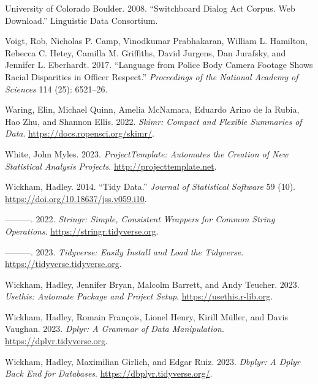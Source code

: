 \documentclass[
  letterpaper,
  DIV=11,
  numbers=noendperiod]{scrreport}
\newlength{\cslhangindent}
\newlength{\cslentryspacingunit} %
\newenvironment{CSLReferences}[2] %
 {%
  \setlength{\parindent}{0pt}
  \ifodd #1
  \let\oldpar\par
  \def\par{\hangindent=\cslhangindent\oldpar}
  \fi
  \setlength{\parskip}{#2\cslentryspacingunit}
 }%
 {}
\theoremstyle{definition}
\theoremstyle{remark}
\begin{document}
\begin{CSLReferences}{1}{0}
\leavevmode{}%
University of Colorado Boulder. 2008. {``Switchboard Dialog Act Corpus.
Web Download.''} Linguistic Data Consortium.

\leavevmode{}%
Voigt, Rob, Nicholas P. Camp, Vinodkumar Prabhakaran, William L.
Hamilton, Rebecca C. Hetey, Camilla M. Griffiths, David Jurgens, Dan
Jurafsky, and Jennifer L. Eberhardt. 2017. {``Language from Police Body
Camera Footage Shows Racial Disparities in Officer Respect.''}
\emph{Proceedings of the National Academy of Sciences} 114 (25):
6521--26.

\leavevmode{}%
Waring, Elin, Michael Quinn, Amelia McNamara, Eduardo Arino de la Rubia,
Hao Zhu, and Shannon Ellis. 2022. \emph{Skimr: Compact and Flexible
Summaries of Data}. \url{https://docs.ropensci.org/skimr/}.

\leavevmode{}%
White, John Myles. 2023. \emph{ProjectTemplate: Automates the Creation
of New Statistical Analysis Projects}. \url{http://projecttemplate.net}.

\leavevmode{}%
Wickham, Hadley. 2014. {``Tidy Data.''} \emph{Journal of Statistical
Software} 59 (10). \url{https://doi.org/10.18637/jss.v059.i10}.

\leavevmode{}%
---------. 2022. \emph{Stringr: Simple, Consistent Wrappers for Common
String Operations}. \url{https://stringr.tidyverse.org}.

\leavevmode{}%
---------. 2023. \emph{Tidyverse: Easily Install and Load the
Tidyverse}. \url{https://tidyverse.tidyverse.org}.

\leavevmode{}%
Wickham, Hadley, Jennifer Bryan, Malcolm Barrett, and Andy Teucher.
2023. \emph{Usethis: Automate Package and Project Setup}.
\url{https://usethis.r-lib.org}.

\leavevmode{}%
Wickham, Hadley, Romain François, Lionel Henry, Kirill Müller, and Davis
Vaughan. 2023. \emph{Dplyr: A Grammar of Data Manipulation}.
\url{https://dplyr.tidyverse.org}.

\leavevmode{}%
Wickham, Hadley, Maximilian Girlich, and Edgar Ruiz. 2023. \emph{Dbplyr:
A Dplyr Back End for Databases}. \url{https://dbplyr.tidyverse.org/}.


\end{CSLReferences}
\end{document}
